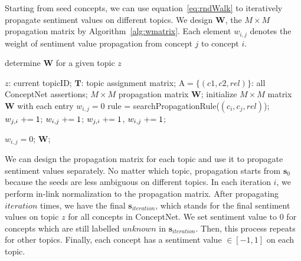Starting from seed concepts, we can use equation~\ref{eq:rndWalk} to iteratively propagate sentiment values on different topics. We design $\boldsymbol{W}$, the $M \times M$ propagation matrix by Algorithm~\ref{alg:wmatrix}. Each element $w_{i,j}$ denotes the weight of sentiment value propagation from concept $j$ to concept $i$.

\begin{algorithm}[htb]
  \caption{determine $\boldsymbol{W}$ for a given topic $z$}
  \label{alg:wmatrix}
  \begin{algorithmic}[1]
  	\Require
  		$z$: current topicID; 
  		$\boldsymbol{T}$: topic assignment matrix;
  		$\text{A} = \{(c1,c2,rel)\}$: all ConceptNet assertions;
    \Ensure
     	$M \times M$ propagation matrix $\boldsymbol{W}$;
	\State initialize $M \times M$ matrix $\boldsymbol{W}$ with each entry $w_{i,j} = 0$    
    \label{code:ruleStart}
    	\State rule = searchPropagationRule($(c_i,c_j,rel)$);
			\State $w_{j,i} \mathrel{+}= 1$;
			\State $w_{i,j} \mathrel{+}= 1$;
			\State $w_{j,i} \mathrel{+}= 1$, $w_{i,j} \mathrel{+}= 1$;
		\EndIf
	\EndFor
	\label{code:ruleEnd}
    
    \label{code:separateContextStart}
			$w_{i,j} = 0$;
		\EndIf
    \EndFor
    \label{code:separateContextEnd}
    \State \Return $\boldsymbol{W}$;
  \end{algorithmic}
\end{algorithm}

We can design the propagation matrix for each topic and use it to propagate sentiment values separately. No matter which topic, propagation starts from $\boldsymbol{s}_0$ because the seeds are less ambiguous on different topics. In each iteration $i$, we perform in-link normalization to the propagation matrix. After propagating $iteration$ times, we have the final $\boldsymbol{s}_{iteration}$, which stands for the final sentiment values on topic $z$ for all concepts in ConceptNet. We set sentiment value to $0$ for concepts which are still labelled $unknown$ in $\boldsymbol{s}_{iteration}$. Then, this process repeats for other topics. Finally, each concept has a sentiment value $\in [-1,1]$ on each topic.
